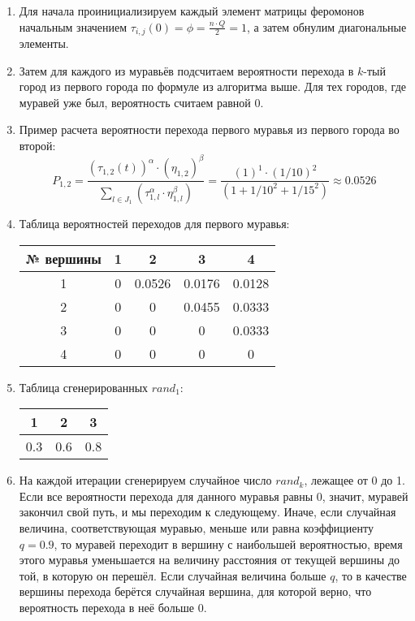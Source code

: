 \documentclass[14pt]{article}
\begin{document}
\begin{enumerate}
    \item Для начала проинициализируем каждый элемент матрицы феромонов начальным значением $\tau_{i,j}(0) = \phi = \frac{n \cdot Q}{2} = 1$, а затем обнулим диагональные элементы.
    \item Затем для каждого из муравьёв подсчитаем вероятности перехода в $k$-тый город из первого города по формуле из алгоритма выше. Для тех городов, где муравей уже был, вероятность считаем равной 0.
    \item Пример расчета вероятности перехода первого муравья из первого города во второй:
    \[
    P_{1,2} = \frac{(\tau_{1,2}(t))^\alpha \cdot (\eta_{1,2})^\beta}{\sum_{l \in J_{1}}(\tau_{1,l}^\alpha \cdot \eta_{1,l}^\beta)} = \frac{(1)^1 \cdot (1/10)^2}{(1 + 1/10^2 + 1/15^2)} \approx 0.0526
    \]
    
    \item Таблица вероятностей переходов для первого муравья:\\
    \begin{tabular}{|c|c|c|c|c|}
        \hline
        № вершины & 1 & 2 & 3 & 4 \\
        \hline
        1 & 0 & 0.0526 & 0.0176 & 0.0128 \\
        2 & 0 & 0 & 0.0455 & 0.0333 \\
        3 & 0 & 0 & 0 & 0.0333 \\
        4 & 0 & 0 & 0 & 0 \\
        \hline
    \end{tabular}
    
    \item Таблица сгенерированных $rand_1$:\\
    \begin{tabular}{|c|c|c|}
        \hline
        1 & 2 & 3 \\
        \hline
        0.3 & 0.6 & 0.8 \\
        \hline
    \end{tabular}
    
    \item На каждой итерации сгенерируем случайное число $rand_k$, лежащее от 0 до 1. Если все вероятности перехода для данного муравья равны 0, значит, муравей закончил свой путь, и мы переходим к следующему. Иначе, если случайная величина, соответствующая муравью, меньше или равна коэффициенту $q = 0.9$, то муравей переходит в вершину с наибольшей вероятностью, время этого муравья уменьшается на величину расстояния от текущей вершины до той, в которую он перешёл. Если случайная величина больше $q$, то в качестве вершины перехода берётся случайная вершина, для которой верно, что вероятность перехода в неё больше 0.
    

\end{enumerate}
\end{document}
